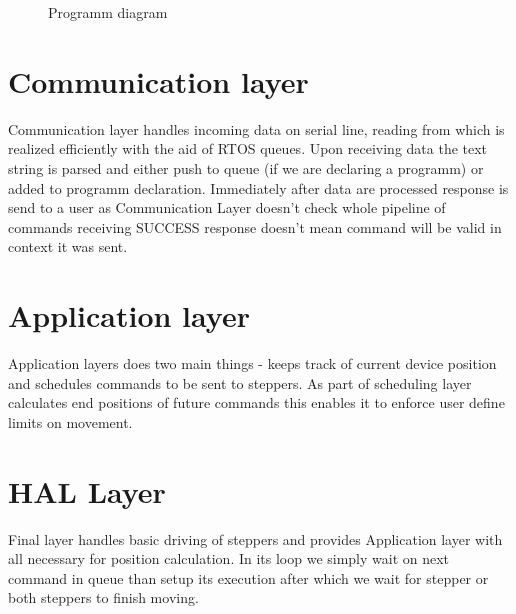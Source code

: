 \begin{figure}[h!]

	\caption[Programm diagram]{Programm diagram}
	\label{fig:code_diag}
\end{figure}

\section{Communication layer}

Communication layer handles incoming data on serial line, reading from which is realized efficiently with the aid of RTOS queues.
Upon receiving data the text string is parsed and either push to queue (if we are declaring a programm) or added to programm declaration.
Immediately after data are processed response is send to a user as Communication Layer doesn't check whole pipeline of commands receiving SUCCESS response doesn't mean command will be valid in context it was sent.

\section{Application layer}

Application layers does two main things - keeps track of current device position and schedules commands to be sent to steppers.
As part of scheduling layer calculates end positions of future commands this enables it to enforce user define limits on movement.

\section{HAL Layer}

Final layer handles basic driving of steppers and provides Application layer with all necessary for position calculation.
In its loop we simply wait on next command in queue than setup its execution after which we wait for stepper or both steppers to finish moving.

